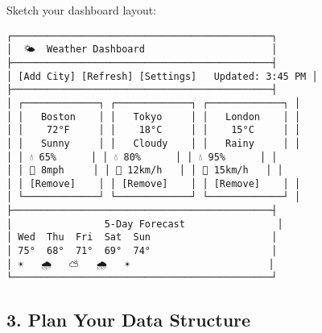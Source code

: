 \documentclass[
  letterpaper,
  DIV=11,
  numbers=noendperiod,
  oneside]{scrreprt}
\begin{document}
Sketch your dashboard layout:

\begin{verbatim}
┌─────────────────────────────────────────────┐
│  🌤️  Weather Dashboard                      │
├─────────────────────────────────────────────┤
│ [Add City] [Refresh] [Settings]   Updated: 3:45 PM │
├─────────────────────────────────────────────┤
│ ┌─────────────┐ ┌─────────────┐ ┌─────────────┐ │
│ │   Boston    │ │   Tokyo     │ │   London    │ │
│ │    72°F     │ │    18°C     │ │    15°C     │ │
│ │   Sunny     │ │   Cloudy    │ │   Rainy     │ │
│ │ 💧 65%      │ │ 💧 80%      │ │ 💧 95%      │ │
│ │ 💨 8mph     │ │ 💨 12km/h   │ │ 💨 15km/h   │ │
│ │ [Remove]    │ │ [Remove]    │ │ [Remove]    │ │
│ └─────────────┘ └─────────────┘ └─────────────┘ │
├─────────────────────────────────────────────┤
│                5-Day Forecast                │
│ Wed  Thu  Fri  Sat  Sun                     │
│ 75°  68°  71°  69°  74°                     │
│ ☀️   🌧️   ⛅   🌧️   ☀️                        │
└─────────────────────────────────────────────┘
\end{verbatim}

\subsection{3. Plan Your Data Structure}\label{plan-your-data-structure}
\end{document}
